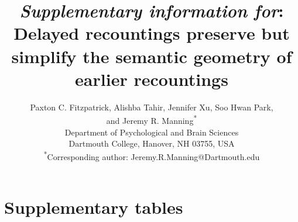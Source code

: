 \documentclass[10pt]{article}
\title{\textit{Supplementary information for}: Delayed recountings preserve but simplify the semantic geometry of earlier recountings}
\author{Paxton C. Fitzpatrick, Alishba Tahir, Jennifer Xu, Soo Hwan Park,\\and Jeremy R. Manning\textsuperscript{*}\\
\small{Department of Psychological and Brain Sciences}\\
\small{Dartmouth College, Hanover, NH 03755, USA}\\
\small{\textsuperscript{*}Corresponding author: Jeremy.R.Manning@Dartmouth.edu}}
\date{}
\begin{document}
\renewcommand{\figurename}{Supplementary Figure}
\renewcommand{\tablename}{Supplementary Table}


\setcounter{equation}{0}
\setcounter{figure}{0}
\setcounter{table}{0}
\setcounter{section}{0}
\makeatletter


\begin{titlepage}
\maketitle
\thispagestyle{empty}
\end{titlepage}


\section*{Supplementary tables}
\end{document}
